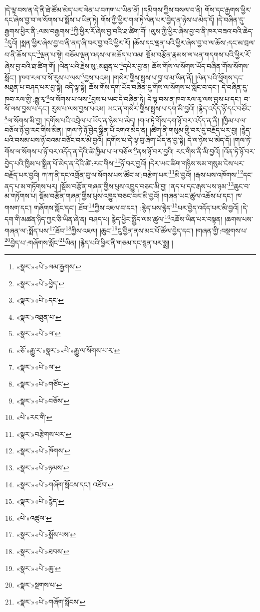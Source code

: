 །དེ་ལྟ་བས་ན་དེ་ནི་ཐེ་ཚོམ་མེད་པར་ལེན་པ་བཀག་པ་ཡིན་ནོ། །དམིགས་ཀྱིས་བསལ་བ་ནི། གོས་དང་རྒྱགས་ཕྱིར་དང་ཞེས་བྱ་བ་ལ་སོགས་པ་སྨོས་པ་ཡིན་ཏེ། གོས་ཀྱི་ཕྱིར་གལ་ཏེ་ལེན་པར་བྱེད་ན་ཉེས་པ་མེད་དོ། །དེ་བཞིན་དུ་རྒྱགས་ཕྱིར་ནི་:ལམ་བརྒྱགས་\footnote{«སྣར་»«པེ་»ལམ་རྒྱགས་}ཀྱི་ཕྱིར་རོ་ཞེས་བྱ་བའི་ཐ་ཚིག་གོ། །ལུས་ཀྱི་ཕྱིར་ཞེས་བྱ་བ་ནི་ཁར་བཟའ་བའི་ཆེད་\footnote{«སྣར་»«པེ་»ཕྱེད་}དུའོ། །སྨན་ཕྱིར་ཞེས་བྱ་བ་ནི་ནད་ཞི་བར་བྱ་བའི་ཕྱིར་རོ། །ཆོས་དང་ལྡན་པའི་ཕྱིར་ཞེས་བྱ་བ་ལ་ཆོས་:དང་མ་བྲལ་བ་ནི་ཆོས་དང་\footnote{«སྣར་»«པེ་»དང་}ལྡན་པ་སྟེ། བཅོམ་ལྡན་འདས་ལ་མཆོད་པ་འམ། སྡོམ་བརྩོན་རྣམས་ལ་ཕན་གདགས་པའི་ཕྱིར་རོ་ཞེས་བྱ་བའི་ཐ་ཚིག་གོ། །ལེན་པའི་རྗེས་སུ་:མཐུན་པ་\footnote{«སྣར་»འཐུན་པ་}དཔེར་བྱ་ན། ཆོས་གོས་ལ་སོགས་ཡོད་བཞིན་གོས་སོགས་སློང་། །ཁབ་རལ་བ་སོ་རུས་པ་ལས་\footnote{«སྣར་»«པེ་»ལ་}བྱས་པའམ། །གསེར་གྱིས་སྤྲས་པ་བྱ་བ་མ་ཡིན་ནོ། །ལེན་པའི་ཕྱོགས་དང་མཐུན་པ་བཤད་པར་བྱ་སྟེ། འདི་ལྟ་སྟེ། ཆོས་གོས་དག་ཡོད་བཞིན་དུ་གོས་ལ་སོགས་པ་སློང་བ་དང་། དེ་བཞིན་དུ་ཁབ་རལ་གྱི་:རྒྱུ་རྭ་\footnote{«ཅོ་»རྒྱུ་ར་«སྣར་»«པེ་»རྒྱུ་ལ་སོགས་པ་རྭ་}ལ་སོགས་པ་ལས་\footnote{«སྣར་»«པེ་»ལ་}བྱས་པ་ཡང་དེ་བཞིན་ཏེ། དེ་ལྟ་བས་ན་ཁབ་རལ་རྭ་ལས་བྱས་པ་དང་། བ་སོ་ལས་བྱས་པ་དང་། རུས་པ་ལས་བྱས་པའམ། ཡང་ན་གསེར་གྱིས་སྤྲས་པ་དག་མི་བྱའོ། །རྙེད་འདོད་ཉོ་དང་བཙོང་\footnote{«སྣར་»«པེ་»གཙོང་}ལ་སོགས་མི་བྱ། །དགོས་པའི་འབྲེལ་པ་ཡོད་ན་ཉེས་པ་མེད། །གལ་ཏེ་གོས་དག་ཉོ་བར་འདོད་ན་ནི། །ཁྱིམ་པ་ལ་བཅོལ་ཉོ་བྱ་རང་གིས་མིན། །གལ་ཏེ་ཉོ་བྱེད་སྒྲིན་པོ་འགའ་མེད་ན། །ཚིག་ནི་གསུམ་གྱི་བར་དུ་བརྗོད་པར་བྱ། །རྙེད་པའི་བསམ་པས་ཉོ་བའམ་བཙོང་བར་མི་བྱའོ། །དགོས་པ་དེ་ལྟ་བུ་ཞིག་ཡོད་ན་བྱ་སྟེ། དེ་ལ་ཉེས་པ་མེད་དོ། །གལ་ཏེ་གོས་ལ་སོགས་པ་ཉོ་བར་འདོད་ན་དེའི་ཚེ་ཁྱིམ་པ་ལ་བཅོལ་\footnote{«སྣར་»«པེ་»བཅོས་}ནས་ཉོ་བར་བྱའི། རང་གིས་ནི་མི་བྱའོ། །འོན་ཏེ་ཉོ་བར་བྱེད་པའི་ཁྱིམ་པ་སྒྲིན་པོ་མེད་ན་དེའི་ཚེ་:རང་གིས་\footnote{«པེ་»རང་གི་}ཉོ་བར་བྱའོ། །དེར་ཡང་ཚིག་གཉིས་སམ་གསུམ་ངེས་པར་བརྗོད་པར་བྱའི། ཀ་ཀ་ནི་དང་འགྲོན་བུ་ལ་སོགས་པས་ཚོང་ལ་:བརྩེག་པར་\footnote{«སྣར་»བརྩེགས་པར་}མི་བྱའོ། །རྒས་པས་འཁོགས་\footnote{«སྣར་»«པེ་»ཁོགས་}དང་ནད་པ་མ་གཏོགས་པར། །སྡོམ་བརྩོན་གཞན་གྱིས་པུས་འཁྱུད་བཅང་མི་བྱ། །ནད་པ་དང་རྒས་པས་ཉམ་\footnote{«སྣར་»«པེ་»ཉམས་}ཆུང་བ་མ་གཏོགས་པ། སྡོམ་བརྩོན་གཞན་གྱིས་པུས་འཁྱུད་བཅང་བར་མི་བྱའོ། །གཞན་ཡང་ཚུལ་འཆོས་པ་དང་། ཁ་གསག་དང་། གཞོགས་སློང་དང་། ཐོབ་\footnote{«སྣར་»«པེ་»གཞོག་སློངས་དང་། འཐོབ་}ཀྱིས་འཇལ་བ་དང་། :རྙེད་པས་རྙེད་\footnote{«སྣར་»«པེ་»རྙེད་}པར་བྱེད་འདོད་པར་མི་བྱའོ། །དེ་དག་གི་མཚན་ཉིད་ཀྱང་ཅི་ཡིན་ཞེ་ན། བཤད་པ། རྙེད་ཕྱིར་སྤྱོད་ལམ་ཚུལ་\footnote{«པེ་»འཚུལ་}འཆོས་ཡིན་པར་བསྟན། །ཆགས་པས་གཞན་ལ་:སྨོད་པས་\footnote{«སྣར་»«པེ་»སྨོས་པས་}ཐོབ་\footnote{«སྣར་»«པེ་»ཐབས་}ཀྱིས་འཇལ། །ཆུང་\footnote{«སྣར་»«པེ་»ཆུ་}ངུ་བྱིན་ནས་མང་པོ་ཚོལ་བྱེད་དང་། །གཞན་གྱི་:བསྔགས་པ་\footnote{«སྣར་»སྔགས་པ་}བྱེད་པ་:གཞོགས་སློང་\footnote{«སྣར་»«པེ་»གཞོག་སློངས་}ཡིན། །རྙེད་པའི་ཕྱིར་ནི་གཅམ་དང་སྙན་པར་སྨྲ། །
